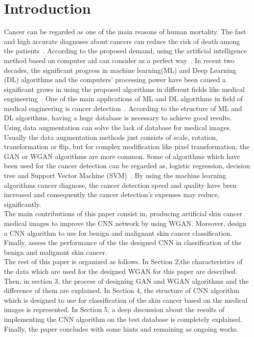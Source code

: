 \documentclass[conference]{IEEEtran}
\begin{document}
\section{Introduction}

Cancer can be regarded as one of the main reasons of human mortality. The fast and high accurate diagnoses about cancers can reduce the risk of death among the patients~\cite{3}. According to the proposed demand, using the artificial intelligence method based on computer aid can consider as a perfect way~\cite{4}. 
In recent two decades, the significant progress in machine learning(ML) and Deep Learning (DL) algorithms and the computers' processing power have been caused a significant grows in using the proposed algorithms in different fields like medical engineering~\cite{5,6,7}. One of the main applications of ML and DL algorithms in field of medical engineering is cancer detection~\cite{8,9,10}.  According to the structure of ML and DL algorithms, having a huge database is necessary to achieve good results. Using data augmentation can solve the lack of database for medical images. Usually the data augmentation methods just consists of scale, rotation, transformation or flip, but for complex modification like pixel transformation, the GAN or WGAN algorithms are more common.
Some of algorithms which have been used for the cancer detection can be regarded as, logistic regression, decision tree and Support Vector Machine (SVM)~\cite{12, 13}. By using the machine learning algorithms cancer diagnose, the cancer detection speed and quality have been increased and consequently the cancer detection's expenses may reduce, significantly.\\
The main contributions of this paper consist in, producing artificial skin cancer medical images to improve the CNN network by using WGAN. Moreover, design a CNN algorithm to use for benign and malignant skin cancer classification. Finally, assess the performance of the the designed CNN in classification of the benign and malignant skin cancer.\\
The rest of this paper is organized as follows. In Section 2,the characteristics of the data which are used for the designed WGAN for this paper are described. Then, in section 3, the process of designing GAN and WGAN algorithms and the difference of them are explained. In Section 4, the structure of CNN algorithm which is designed to use for classification of the skin cancer based on the medical images is represented. In Section 5, a deep discussion about the results of implementing the CNN algorithm on the test database is completely explained. Finally, the paper concludes with some hints and remaining as ongoing works.
\end{document}
